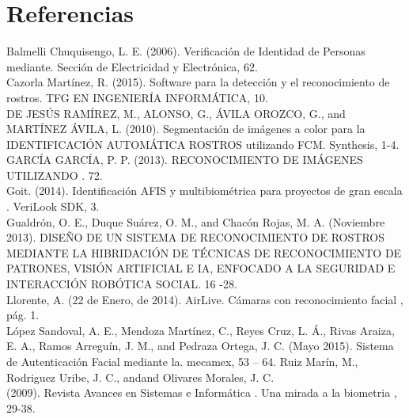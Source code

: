 \documentclass{comjnl}
\begin{document}
\section{Referencias}


Balmelli Chuquisengo, L. E. (2006). Verificación de Identidad de Personas mediante. Sección de Electricidad y Electrónica, 62.\\
Cazorla Martínez, R. (2015). Software para la detección y el reconocimiento de rostros. TFG EN INGENIERÍA INFORMÁTICA, 10.\\
DE JESÚS RAMÍREZ, M., ALONSO, G., ÁVILA OROZCO, G., and MARTÍNEZ ÁVILA, L. (2010). Segmentación de imágenes a color para la IDENTIFICACIÓN AUTOMÁTICA ROSTROS utilizando FCM. Synthesis, 1-4.\\
GARCÍA GARCÍA, P. P. (2013). RECONOCIMIENTO DE IMÁGENES UTILIZANDO . 72.\\
Goit. (2014). Identificación AFIS y multibiométrica para proyectos de gran escala . VeriLook SDK, 3.\\
Gualdrón, O. E., Duque Suárez, O. M., and Chacón Rojas, M. A. (Noviembre 2013). DISEÑO DE UN SISTEMA DE RECONOCIMIENTO DE ROSTROS MEDIANTE LA HIBRIDACIÓN DE TÉCNICAS DE RECONOCIMIENTO DE PATRONES, VISIÓN ARTIFICIAL E IA, ENFOCADO A LA SEGURIDAD E INTERACCIÓN ROBÓTICA SOCIAL. 16 -28.\\
Llorente, A. (22 de Enero, de 2014). AirLive. Cámaras con reconocimiento facial , pág. 1.\\
López Sandoval, A. E., Mendoza Martínez, C., Reyes Cruz, L. Á., Rivas Araiza, E. A., Ramos Arreguín, J. M., and Pedraza Ortega, J. C. (Mayo 2015). Sistema de Autenticación Facial mediante la. mecamex, 53 – 64.
Ruiz Marín, M., Rodriguez Uribe, J. C., andand Olivares Morales, J. C.\\ (2009). Revista Avances en Sistemas e Informática . Una mirada a la biometria , 29-38.
\end{document}
